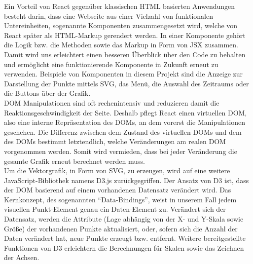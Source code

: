 \documentclass{article}
\begin{document}
Ein Vorteil von React gegenüber klassischen HTML basierten Anwendungen besteht darin, dass eine Webseite aus einer Vielzahl von funktionalen Untereinheiten, sogenannte Komponenten zusammengesetzt wird, welche von React später als HTML-Markup gerendert werden.
In einer Komponente gehört die Logik bzw. die Methoden sowie das Markup in Form von JSX zusammen.
Damit wird uns erleichtert einen besseren Überblick über den Code zu behalten und ermöglicht eine funktionierende Komponente in Zukunft erneut zu verwenden. Beispiele von Komponenten in diesem Projekt sind die Anzeige zur Darstellung der Punkte mittels SVG, das Menü, die Auswahl des Zeitraums oder die Buttons über der Grafik.\\

DOM Manipulationen sind oft rechenintensiv und reduzieren damit die Reaktionsgeschwindigkeit der Seite.
Deshalb pflegt React einen virtuellen DOM, also eine interne Repräsentation des DOMs, an dem vorerst die Manipulationen geschehen.
Die Differenz zwischen dem Zustand des virtuellen DOMs und dem des DOMs bestimmt letztendlich, welche Veränderungen am realen DOM vorgenommen werden.
Somit wird vermieden, dass bei jeder Veränderung die gesamte Grafik erneut berechnet werden muss.\\


Um die Vektorgrafik, in Form von SVG, zu erzeugen, wird auf eine weitere JavaScript-Bibliothek namens D3.js zurückgegriffen.
Der Ansatz von D3 ist, dass der DOM basierend auf einem vorhandenen Datensatz verändert wird. Das Kernkonzept, des sogenannten "`Data-Bindings"', weist in unserem Fall jedem visuellen Punkt-Element genau ein Daten-Element zu.
Verändert sich der Datensatz, werden die Attribute (Lage abhängig von der X- und Y-Skala sowie Größe) der vorhandenen Punkte aktualisiert, oder, sofern sich die Anzahl der Daten verändert hat, neue Punkte erzeugt bzw. entfernt.
Weitere bereitgestellte Funktionen von D3 erleichtern die Berechnungen für Skalen sowie das Zeichnen der Achsen.

\vspace{0.5cm}
\end{document}
